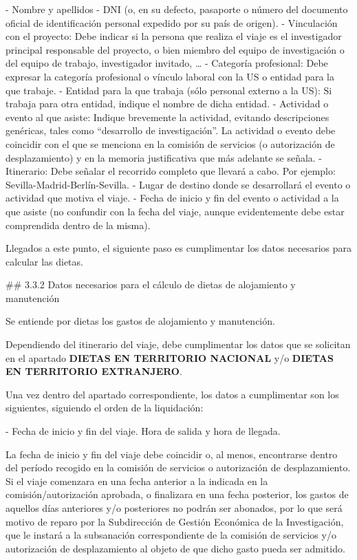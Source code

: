 \documentclass{article}
\begin{document}
\begin{itemize}
\begin{itemize}
\begin{scriptsize}
                  - Nombre y apellidos
                  - DNI (o, en su defecto, pasaporte o número del documento oficial de identificación personal expedido por su país de origen).
                  - Vinculación con el proyecto: Debe indicar si la persona que realiza el viaje es el investigador principal responsable del proyecto, o bien miembro del equipo de investigación o del equipo de trabajo, investigador invitado, …
                  - Categoría profesional: Debe expresar la categoría profesional o vínculo laboral con la US o entidad para la que trabaje.
                  - Entidad para la que trabaja (sólo personal externo a la US): Si trabaja para otra entidad, indique el nombre de dicha entidad.
                  - Actividad o evento al que asiste: Indique brevemente la actividad, evitando descripciones genéricas, tales como “desarrollo de investigación”. La actividad o evento debe coincidir con el que se menciona en la comisión de servicios (o autorización de desplazamiento) y en la memoria justificativa que más adelante se señala.
                  - Itinerario: Debe señalar el recorrido completo que llevará a cabo. Por ejemplo: Sevilla-Madrid-Berlín-Sevilla.
                  - Lugar de destino donde se desarrollará el evento o actividad que motiva el viaje.
                  - Fecha de inicio y fin del evento o actividad a la que asiste (no confundir con la fecha del viaje, aunque evidentemente debe estar comprendida dentro de la misma).

                  Llegados a este punto, el siguiente paso es cumplimentar los datos necesarios para calcular las dietas.

                  \#\# 3.3.2 Datos necesarios para el cálculo de dietas de alojamiento y manutención

                  Se entiende por dietas los gastos de alojamiento y manutención.

                  Dependiendo del itinerario del viaje, debe cumplimentar los datos que se solicitan en el apartado \textbf{DIETAS EN TERRITORIO NACIONAL} y/o \textbf{DIETAS EN TERRITORIO EXTRANJERO}.

                  Una vez dentro del apartado correspondiente, los datos a cumplimentar son los siguientes, siguiendo el orden de la liquidación:

                  - Fecha de inicio y fin del viaje. Hora de salida y hora de llegada.

                  La fecha de inicio y fin del viaje debe coincidir o, al menos, encontrarse dentro del período recogido en la comisión de servicios o autorización de desplazamiento. Si el viaje comenzara en una fecha anterior a la indicada en la comisión/autorización aprobada, o finalizara en una fecha posterior, los gastos de aquellos días anteriores y/o posteriores no podrán ser abonados, por lo que será motivo de reparo por la Subdirección de Gestión Económica de la Investigación, que le instará a la subsanación correspondiente de la comisión de servicios y/o autorización de desplazamiento al objeto de que dicho gasto pueda ser admitido.


\end{scriptsize}
\end{itemize}
\end{itemize}
\end{document}
